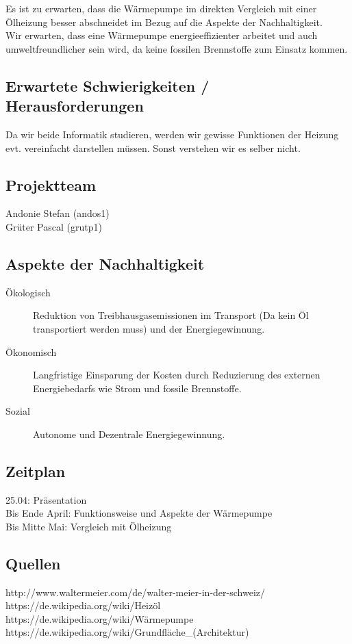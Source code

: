 \documentclass[09pt,paper=a4,final]{scrartcl}
\begin{document}
Es ist zu erwarten, dass die Wärmepumpe im direkten Vergleich mit einer
Ölheizung besser abschneidet im Bezug auf die Aspekte der Nachhaltigkeit.
\\
Wir erwarten, dass eine Wärmepumpe energieeffizienter arbeitet und auch
umweltfreundlicher sein wird, da keine fossilen Brennstoffe zum Einsatz kommen.

\subsection*{Erwartete Schwierigkeiten / Herausforderungen}

Da wir beide Informatik studieren, werden wir gewisse Funktionen der Heizung evt. vereinfacht darstellen müssen. Sonst verstehen wir es selber nicht.

\subsection*{Projektteam}

  \begin{description}
    \item[Andonie Stefan (andos1)]
    \item[Grüter Pascal (grutp1)]
  \end{description}

\subsection*{Aspekte der Nachhaltigkeit}

  \begin{description}
    \item[Ökologisch] Reduktion von Treibhausgasemissionen im Transport (Da kein Öl transportiert werden muss) und
    der Energiegewinnung.
    \item[Ökonomisch] Langfristige Einsparung der Kosten durch Reduzierung des
    externen Energiebedarfs wie Strom und fossile Brennstoffe.
    \item[Sozial] Autonome und Dezentrale Energiegewinnung.
  \end{description}

\subsection*{Zeitplan}

25.04: Präsentation \\
Bis Ende April: Funktionsweise und Aspekte der Wärmepumpe \\
Bis Mitte Mai: Vergleich mit Ölheizung

\subsection*{Quellen}

http://www.waltermeier.com/de/walter-meier-in-der-schweiz/ \\
https://de.wikipedia.org/wiki/Heizöl \\
https://de.wikipedia.org/wiki/Wärmepumpe \\
https://de.wikipedia.org/wiki/Grundfläche\_(Architektur) \\
\end{document}
